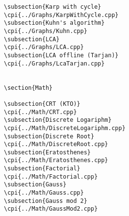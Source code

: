 {\begin{verbatim}
\subsection{Karp with cycle}
\cpi{../Graphs/KarpWithCycle.cpp}
\subsection{Kuhn's algorithm}
\cpi{../Graphs/Kuhn.cpp}
\subsection{LCA}
\cpi{../Graphs/LCA.cpp}
\subsection{LCA offline (Tarjan)}
\cpi{../Graphs/LcaTarjan.cpp}


\section{Math}

\subsection{CRT (KTO)}
\cpi{../Math/CRT.cpp}
\subsection{Discrete Logariphm}
\cpi{../Math/DiscreteLogariphm.cpp}
\subsection{Discrete Root}
\cpi{../Math/DiscreteRoot.cpp}
\subsection{Eratosthenes}
\cpi{../Math/Eratosthenes.cpp}
\subsection{Factorial}
\cpi{../Math/Factorial.cpp}
\subsection{Gauss}
\cpi{../Math/Gauss.cpp}
\subsection{Gauss mod 2}
\cpi{../Math/GaussMod2.cpp}

\end{verbatim}}
